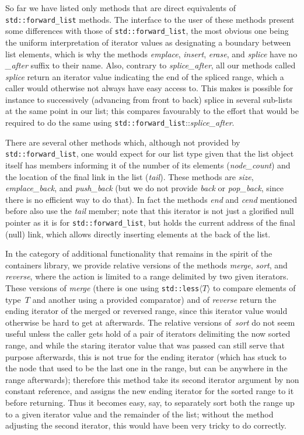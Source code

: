 \documentclass[12pt]{article}
\theoremstyle{plain}
\theoremstyle{definition}
\newcommand\std[1]{\texttt{std::#1}}
\def\frwl.{\std{forward\_list}}
\def\spla.{\textit{splice\_\!after}}
\def\ang#1{\langle#1\rangle}
\begin{document}
So far we have listed only methods that are direct equivalents of \frwl.
methods. The interface to the user of these methods present some differences
with those of \frwl., the most obvious one being the uniform interpretation of
iterator values as designating a boundary between list elements, which is why
the methods \textit{emplace}, \textit{insert}, \textit{erase}, and
\textit{splice} have no \textit{\_\!after} suffix to their name. Also, contrary
to \spla., all our methods called \textit{splice} return an iterator value
indicating the end of the spliced range, which a caller would otherwise not
always have easy access to. This makes is possible for instance to successively
(advancing from front to back) splice in several sub-lists at the same point in
our list; this compares favourably to the effort that would be required to do
the same using \frwl.::\spla..

There are several other methods which, although not provided by \frwl., one
would expect for our list type given that the list object itself has members
informing it of the number of its elements (\textit{node\_count}) and the
location of the final link in the list (\textit{tail}). These methods are
\textit{size}, \textit{emplace\_back}, and \textit{push\_back} (but we do not
provide \textit{back} or \textit{pop\_back}, since there is no efficient way to
do that). In fact the methods \textit{end} and \textit{cend} mentioned before
also use the \textit{tail} member; note that this iterator is not just a
glorified null pointer as it is for \frwl., but holds the current address of the
final (null) link, which allows directly inserting elements at the back of the
list.

In the category of additional functionality that remains in the spirit of the
containers library, we provide relative versions of the methods \textit{merge},
\textit{sort}, and \textit{reverse}, where the action is limited to a range
delimited by two given iterators. These versions of \textit{merge} (there is one
using \std{less}$\ang{T}$ to compare elements of type~$T$ and another using a
provided comparator) and of \textit{reverse} return the ending iterator of the
merged or reversed range, since this iterator value would otherwise be hard to
get at afterwards. The relative versions of~\textit{sort} do not seem useful
unless the caller gets hold of a pair of iterators delimiting the now sorted
range, and while the staring iterator value that was passed can still serve that
purpose afterwards, this is not true for the ending iterator (which has stuck to
the node that used to be the last one in the range, but can be anywhere in the
range afterwards); therefore this method take its second iterator argument by
non constant reference, and assigns the new ending iterator for the sorted range
to it before returning. Thus it becomes easy, say, to separately sort both the
range up to a given iterator value and the remainder of the list; without the
method adjusting the second iterator, this would have been very tricky to do
correctly.
\end{document}
